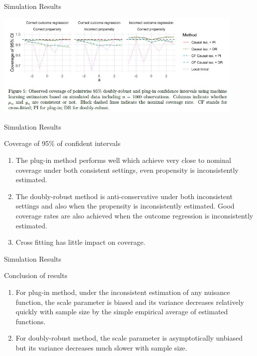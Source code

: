 \documentclass{beamer}
\begin{document}

\begin{frame}{Simulation Results}

\includegraphics[width=12cm]{Causal Isotonic Regression/CIRS505}

\end{frame}


\begin{frame}{Simulation Results}

\begin{block}{Coverage of 95$\%$ of confident intervals}
	\begin{enumerate}
	\item The plug-in method performs well which achieve very close to nominal coverage under both consistent settings, even propensity is inconsistently estimated.
	\item The doubly-robust method is anti-conservative under both inconsistent settings and also when the propensity is inconsistently estimated. Good coverage rates are also achieved when the outcome regression is inconsistently estimated.
	\item Cross fitting has little impact on coverage.
	\end{enumerate}
\end{block}

\end{frame}


\begin{frame}{Simulation Results}

\begin{block}{Conclusion of results}
	\begin{enumerate}
	\item For plug-in method, under the inconsistent estimation of any nuisance function, the scale parameter is biased and its variance decreases relatively quickly with sample size by the simple empirical average of estimated functions.
	\item For doubly-robust method, the scale parameter is asymptotically unbiased but its variance decreases much slower with sample size.
	\end{enumerate}
\end{block}

\end{frame}
\end{document}
